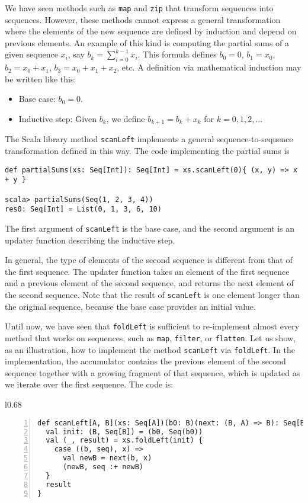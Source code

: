 We have seen methods such as \lstinline!map! and \lstinline!zip!
that transform sequences into sequences. However, these methods cannot
express a general transformation where the elements of the new sequence
are defined by induction and depend on previous elements. An example
of this kind is computing the partial sums of a given sequence $x_{i}$,
say $b_{k}=\sum_{i=0}^{k-1}x_{i}$. This formula defines $b_{0}=0$,
$b_{1}=x_{0}$, $b_{2}=x_{0}+x_{1}$, $b_{3}=x_{0}+x_{1}+x_{2}$,
etc. A definition via mathematical induction may be written like this:
\begin{itemize}
\item Base case: $b_{0}=0$.
\item Inductive step: Given $b_{k}$, we define $b_{k+1}=b_{k}+x_{k}$ for
$k=0,1,2,...$
\end{itemize}
The Scala library method \lstinline!scanLeft! implements a general
sequence-to-sequence transformation defined in this way. The code
implementing the partial sums is
\begin{lstlisting}
def partialSums(xs: Seq[Int]): Seq[Int] = xs.scanLeft(0){ (x, y) => x + y }

scala> partialSums(Seq(1, 2, 3, 4))
res0: Seq[Int] = List(0, 1, 3, 6, 10)
\end{lstlisting}
The first argument of \lstinline!scanLeft! is the base case, and
the second argument is an updater function describing the inductive
step.

In general, the type of elements of the second sequence is different
from that of the first sequence. The updater function takes an element
of the first sequence and a previous element of the second sequence,
and returns the next element of the second sequence. Note that the
result of \lstinline!scanLeft! is one element longer than the original
sequence, because the base case provides an initial value.

Until now, we have seen that \lstinline!foldLeft! is sufficient to
re-implement almost every method that works on sequences, such as
\lstinline!map!, \lstinline!filter!, or \lstinline!flatten!. Let
us show, as an illustration, how to implement the method \lstinline!scanLeft!
via \lstinline!foldLeft!. In the implementation, the accumulator
contains the previous element of the second sequence together with
a growing fragment of that sequence, which is updated as we iterate
over the first sequence. The code is:

\begin{wrapfigure}{l}{0.68\columnwidth}%
\vspace{-0.95\baselineskip}
\begin{lstlisting}[numbers=left]
def scanLeft[A, B](xs: Seq[A])(b0: B)(next: (B, A) => B): Seq[B] = {
  val init: (B, Seq[B]) = (b0, Seq(b0))
  val (_, result) = xs.foldLeft(init) {
    case ((b, seq), x) =>
      val newB = next(b, x)
      (newB, seq :+ newB)
  }
  result
}
\end{lstlisting}

\vspace{-1.2\baselineskip}
\end{wrapfigure}%

